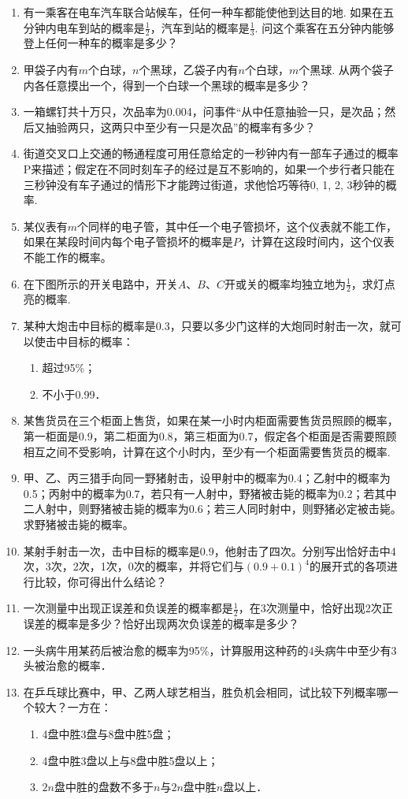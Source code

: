 \begin{enumerate}
\item 有一乘客在电车汽车联合站候车，任何一种车都能使他到达目的地. 如果在五分钟内电车到站的概率是$\frac{1}{2}$，汽车到站的概率是$\frac{1}{3}$. 问这个乘客在五分钟内能够登上任何一种车的概率是多少？
\item 甲袋子内有$m$个白球，$n$个黑球，乙袋子内有$n$个白球，$m$个黑球. 从两个袋子内各任意摸出一个，得到一个白球一个黑球的概率是多少？
\item 一箱螺钉共十万只，次品率为0.004，问事件“从中任意抽验一只，是次品；然后又抽验两只，这两只中至少有一只是次品”的概率有多少？
\item 街道交叉口上交通的畅通程度可用任意给定的一秒钟内有一部车子通过的概率P来描述；假定在不同时刻车子的经过是互不影响的，如果一个步行者只能在三秒钟没有车子通过的情形下才能跨过街道，求他恰巧等待0, 1, 2, 3秒钟的概率.
\item 某仪表有$m$个同样的电子管，其中任一个电子管损坏，这个仪表就不能工作，如果在某段时间内每个电子管损坏的概率是$P$，计算在这段时间内，这个仪表不能工作的概率。
\item 在下图所示的开关电路中，开关$A$、$B$、$C$开或关的概率均独立地为$\frac{1}{2}$，求灯点亮的概率.

\item 某种大炮击中目标的概率是0.3，只要以多少门这样的大炮同时射击一次，就可以使击中目标的概率：
\begin{multicols}{2}
\begin{enumerate}[(1)]
\item 超过95\%；    \item 不小于0.99．
\end{enumerate}
\end{multicols}

\item 某售货员在三个柜面上售货，如果在某一小时内柜面需要售货员照顾的概率，第一柜面是0.9，第二柜面为0.8，第三柜面为0.7，假定各个柜面是否需要照顾相互之间不受影响，计算在这个小时内，至少有一个柜面需要售货员的概率.
\item 甲、乙、丙三猎手向同一野猪射击，设甲射中的概率为0.4；乙射中的概率为0.5；丙射中的概率为0.7，若只有一人射中，野猪被击毙的概率为0.2；若其中二人射中，则野猪被击毙的概率为0.6；若三人同时射中，则野猪必定被击毙。求野猪被击毙的概率。
\item 某射手射击一次，击中目标的概率是0.9，他射击了四次。分别写出恰好击中4次，3次，2次，1次，0次的概率，并将它们与$(0.9+0.1)^4$的展开式的各项进行比较，你可得出什么结论？
\item 一次测量中出现正误差和负误差的概率都是$\frac{1}{2}$，在3次测量中，恰好出现2次正误差的概率是多少？恰好出现两次负误差的概率是多少？
\item 一头病牛用某药后被治愈的概率为95\%，计算服用这种药的4头病牛中至少有3头被治愈的概率．
\item 在乒乓球比赛中，甲、乙两人球艺相当，胜负机会相同，试比较下列概率哪一个较大？一方在：
\begin{enumerate}[(1)]
\item 4盘中胜3盘与8盘中胜5盘；
\item 4盘中胜3盘以上与8盘中胜5盘以上；
\item $2n$盘中胜的盘数不多于$n$与$2n$盘中胜$n$盘以上．
\end{enumerate}


\end{enumerate}

